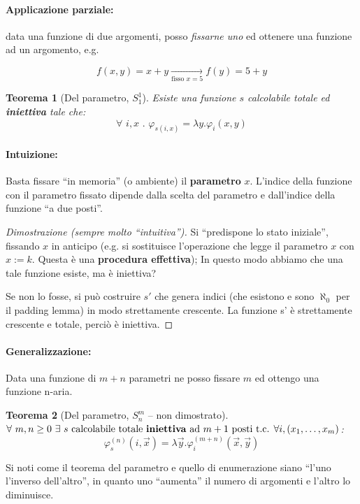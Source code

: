 \documentclass[a4paper,10pt,oneside]{article}
\theoremstyle{break}
\newtheorem{teo}{Teorema}[subsection]
\begin{document}
\paragraph{Applicazione parziale:} data una funzione di due argomenti, posso \emph{fissarne uno} ed ottenere una funzione ad un argomento, e.g.

\[ f(x, y) = x+y \underset{\text{fisso }x=5}{\longrightarrow} f(y) = 5+y\]
\begin{mdframed}
\begin{teo}[Del parametro, $S_1^1$]
Esiste una funzione $s$ calcolabile totale ed \textbf{iniettiva} tale che:
\[\forall \,\,i, x \,\,.\,\, \varphi_{s(i, x)} = \lambda y.\varphi_i(x, y)\]
\end{teo}

\dotfill

\paragraph{Intuizione:} Basta fissare ``in memoria'' (o ambiente) il \textbf{parametro} $x$. L'indice della funzione con il parametro fissato dipende dalla scelta del parametro e dall'indice della funzione ``a due posti''.

\dotfill

\begin{proof} [Dimostrazione (sempre molto ``intuitiva'')] Si ``predispone lo stato iniziale'', fissando $x$ in anticipo (e.g. si sostituisce l'operazione che legge il parametro $x$ con $x := k$. Questa è una \textbf{procedura effettiva}); In questo modo abbiamo che una tale funzione esiste, ma è iniettiva?\smallskip

Se non lo fosse, si può costruire $s'$ che genera indici (che esistono e sono $\aleph_0$ per il padding lemma) in modo strettamente crescente. La funzione s' è strettamente crescente e totale, perciò è iniettiva.
\end{proof}

\dotfill

\paragraph{Generalizzazione:} Data una funzione di $m + n$ parametri ne posso fissare $m$ ed ottengo una funzione n-aria.

\begin{teo}[Del parametro, $S_n^m$ -- non dimostrato]
$\forall \,\,m, n \geq 0\,\, \exists\,\, s \text{ calcolabile totale \textbf{iniettiva} ad $m+1$ posti t.c. }\forall i, (x_1, \hdots, x_m)$:
\[ \varphi_s^{(n)}(i, \vec x) = \lambda \vec y . \varphi_i^{(m+n)} (\vec x, \vec y)\]
\end{teo}


Si noti come il teorema del parametro e quello di enumerazione siano ``l'uno l'inverso dell'altro'', in quanto uno ``aumenta'' il numero di argomenti e l'altro lo diminuisce.


\end{mdframed}
\end{document}
